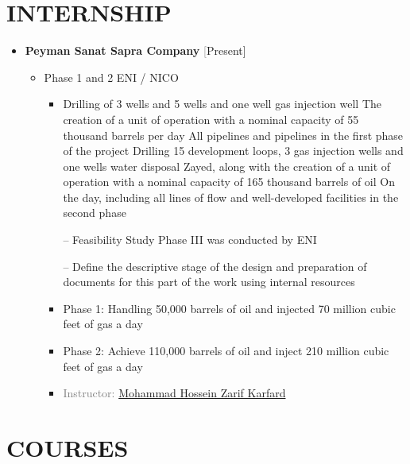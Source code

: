 \documentclass[10pt,a4paper,sans]{moderncv} %
\begin{document}
	\section{INTERNSHIP}
	\begin{itemize}
		\item {}  \textbf{Peyman Sanat Sapra Company}  \textcolor{gray}     \hfill\textcolor{gray}   [Present]
		\begin{itemize}
			\item Phase 1 and 2 ENI / NICO


			\begin{itemize} 
		     	\item Drilling of 3 wells and 5 wells and one well gas injection well The creation of a unit of operation with a nominal capacity of 55 thousand barrels per day All pipelines and pipelines in the first phase of the project Drilling 15 development loops, 3 gas injection wells and one wells water disposal Zayed, along with the creation of a unit of operation with a nominal capacity of 165 thousand barrels of oil On the day, including all lines of flow and well-developed facilities in the second phase

                 – Feasibility Study Phase III was conducted by ENI

                 – Define the descriptive stage of the design and preparation of documents for this part of the work using internal resources
		     	\item Phase 1: Handling 50,000 barrels of oil and injected 70 million cubic feet of gas a day
				\item Phase 2: Achieve 110,000 barrels of oil and inject 210 million cubic feet of gas a day
				\item \textcolor{gray}{Instructor: \href{http://pssapra.ir/}{Mohammad Hossein Zarif Karfard}}
			\end{itemize}
			
				\newline
			
		\end{itemize}
	\end{itemize}
	
	\section{COURSES}
	\vspace{-1.1 em} 
	
\end{document}
